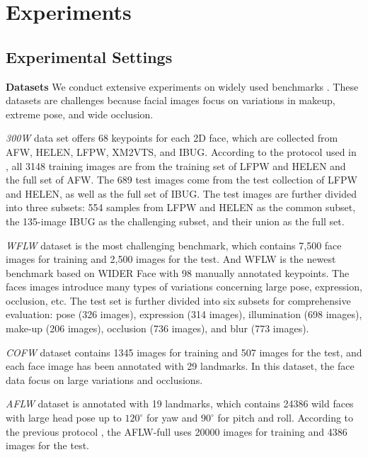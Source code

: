 \documentclass[journal,transmag]{IEEEtran}
\begin{document}
\section{Experiments}
\label{sec:experiments}
\subsection{Experimental Settings}
{\bf Datasets }  We conduct extensive experiments on widely used benchmarks \cite{300W,AFLW,LABWFLW,COFW}. 
These datasets are challenges because facial images focus on variations in makeup, extreme pose, and wide occlusion.

\emph{300W}\cite{300W} data set offers 68 keypoints for each 2D face, which are collected from AFW\cite{zhu2012face}, HELEN\cite{le2012interactive}, LFPW\cite{belhumeur2013localizing},  XM2VTS\cite{messer1999xm2vtsdb}, and IBUG. 
According to the protocol used in \cite{zhu2012face}, all 3148 training images are from the training set of LFPW and HELEN and the full set of AFW. 
The 689 test images come from the test collection of LFPW and HELEN, as well as the full set of IBUG. 
The test images are further divided into three subsets: 554 samples from LFPW and HELEN as the common subset, the 135-image IBUG as the challenging subset, and their union as the full set.

\emph{WFLW}\cite{LABWFLW} dataset is the most challenging benchmark, which contains 7,500 face images for training and 2,500 images for the test.
And WFLW is the newest benchmark based on WIDER Face\cite{yang2016wider} with 98 manually annotated keypoints. 
The faces images introduce many types of variations concerning large pose, expression, occlusion, etc. 
The test set is further divided into six subsets for comprehensive evaluation: pose (326 images), expression (314 images), illumination (698 images), make-up (206 images), occlusion (736 images), and blur (773 images).


\emph{COFW}\cite{COFW} dataset contains 1345 images for training and 507 images for the test, and each face image has been annotated with 29 landmarks.
In this dataset, the face data focus on large variations and occlusions. 

\emph{AFLW}\cite{AFLW} dataset is annotated with 19 landmarks, which contains 24386 wild faces with large head pose up to $120^{\circ}$ for yaw and $90^{\circ}$ for pitch and roll. 
According to the previous protocol \cite{zhu2015face,zhu2016unconstrained}, the AFLW-full uses 20000 images for training and 4386 images for the test.
\end{document}
